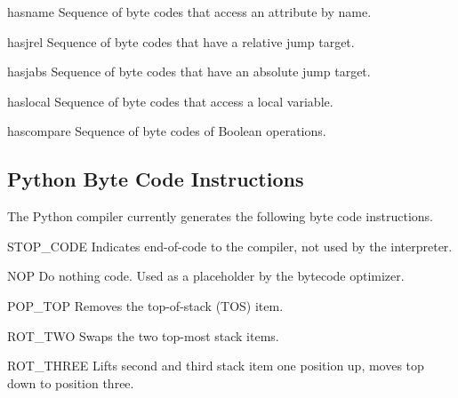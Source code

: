 \begin{datadesc}{hasname}
Sequence of byte codes that access an attribute by name.
\end{datadesc}

\begin{datadesc}{hasjrel}
Sequence of byte codes that have a relative jump target.
\end{datadesc}

\begin{datadesc}{hasjabs}
Sequence of byte codes that have an absolute jump target.
\end{datadesc}

\begin{datadesc}{haslocal}
Sequence of byte codes that access a local variable.
\end{datadesc}

\begin{datadesc}{hascompare}
Sequence of byte codes of Boolean operations.
\end{datadesc}

\subsection{Python Byte Code Instructions}
\label{bytecodes}

The Python compiler currently generates the following byte code
instructions.


\begin{opcodedesc}{STOP_CODE}{}
Indicates end-of-code to the compiler, not used by the interpreter.
\end{opcodedesc}

\begin{opcodedesc}{NOP}{}
Do nothing code.  Used as a placeholder by the bytecode optimizer.
\end{opcodedesc}

\begin{opcodedesc}{POP_TOP}{}
Removes the top-of-stack (TOS) item.
\end{opcodedesc}

\begin{opcodedesc}{ROT_TWO}{}
Swaps the two top-most stack items.
\end{opcodedesc}

\begin{opcodedesc}{ROT_THREE}{}
Lifts second and third stack item one position up, moves top down
to position three.
\end{opcodedesc}

